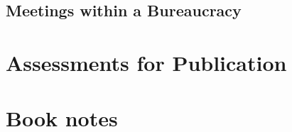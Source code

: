 \documentclass{book}
\begin{document}
  \section{Meetings within a Bureaucracy}
    
    
    
    
    
    
    
    






\appendix

\chapter{Assessments for Publication}
\newpage %
\newpage  %

\chapter{Book notes}
\newpage
\newpage
\newpage
\newpage
\newpage
\newpage
\newpage
\newpage



\clearpage

\printglossaries

\nocite{*} %



\end{document}
